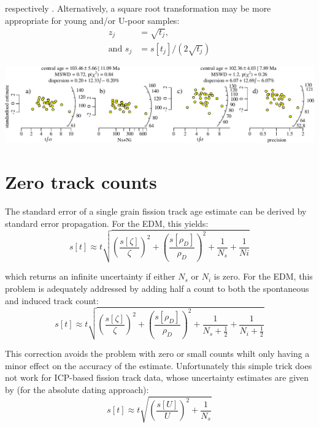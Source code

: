 \begin{refsection}
respectively \citep{galbraith2010b}. Alternatively, a square root
transformation may be more appropriate for young and/or U-poor
samples:
\begin{align}
  z_j & = \sqrt{{t}_j} \mbox{,}   \label{eq:zj3} \\
  \mbox{and~} s_j & = s[{t}_j]\bigg/\left(2\sqrt{{t}_j}\right)
  \label{eq:sj3}
\end{align}

\noindent\includegraphics[width=\linewidth]{../figures/FTradial.pdf}
\begingroup {}  \endgroup

\section{Zero track counts}
\label{sec:zeroICP}

The standard error of a single grain fission track age estimate can be
derived by standard error propagation.  For the EDM, this yields:
\begin{equation}
s[{t}] \approx {t} \sqrt{ 
  \left(\frac{s[{\zeta}]}{{\zeta}}\right)^2 +
  \left(\frac{s[{\rho_D}]}{{\rho_D}}\right)^2 +
  \frac{1}{N_s} + \frac{1}{Ni}
}
\label{eq:stEDM}
\end{equation}

\noindent which returns an infinite uncertainty if either $N_s$ or
$N_i$ is zero. For the EDM, this problem is adequately addressed by
adding half a count to both the spontaneous and induced track count:
\begin{equation}
s[{t}] \approx {t} \sqrt{ 
  \left(\frac{s[{\zeta}]}{{\zeta}}\right)^2 +
  \left(\frac{s[{\rho_D}]}{{\rho_D}}\right)^2 +
  \frac{1}{N_s+\frac{1}{2}} + \frac{1}{N_i+\frac{1}{2}}
}
\label{eq:stEDM0}
\end{equation}

This correction avoids the problem with zero or small counts whilt
only having a minor effect on the accuracy of the
estimate. Unfortunately this simple trick does not work for ICP-based
fission track data, whose uncertainty estimates are given by (for the
absolute dating approach):
\begin{equation}
s[{t}] \approx {t} \sqrt{ 
  \left(\frac{s[{U}]}{{U}}\right)^2 +
  \frac{1}{N_s}
}
\label{eq:shatt4}
\end{equation}


\end{refsection}
